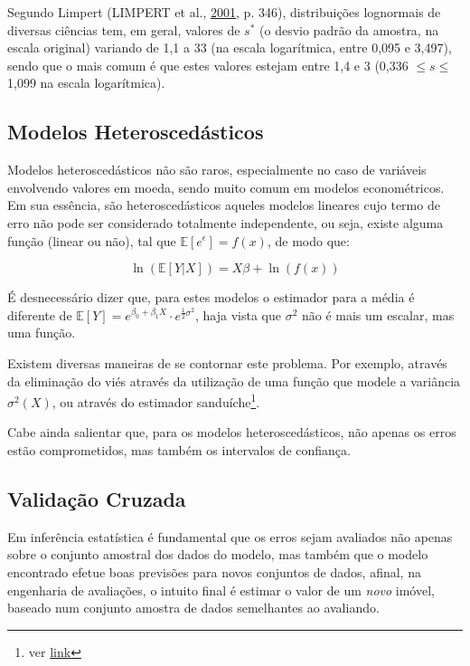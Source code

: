 \documentclass[a4paper, 12pt]{article}
\let\rmarkdownfootnote\footnote%
\def\footnote{\protect\rmarkdownfootnote}
\begin{document}
Segundo Limpert (LIMPERT et al., \protect\hyperlink{ref-limpert}{2001},
p. 346), distribuições lognormais de diversas ciências tem, em geral,
valores de \(s^*\) (o desvio padrão da amostra, na escala original)
variando de 1,1 a 33 (na escala logarítmica, entre 0,095 e 3,497), sendo
que o mais comum é que estes valores estejam entre 1,4 e 3 (0,336
\(\leq s \leq\) 1,099 na escala logarítmica).

\subsection{Modelos Heteroscedásticos}\label{modelos-heteroscedasticos}

Modelos heteroscedásticos não são raros, especialmente no caso de
variáveis envolvendo valores em moeda, sendo muito comum em modelos
econométricos. Em sua essência, são heteroscedásticos aqueles modelos
lineares cujo termo de erro não pode ser considerado totalmente
independente, ou seja, existe alguma função (linear ou não), tal que
\(\mathbb{E}[e^\epsilon] = f(x)\), de modo que:

\[\ln(\mathbb{E}[Y|X]) = X\beta + \ln(f(x))\]

É desnecessário dizer que, para estes modelos o estimador para a média é
diferente de
\(\mathbb{E}[Y] = e^{\beta_0 + \beta_1X} \cdot e^{\frac{1}{2}\sigma^2}\),
haja vista que \(\sigma^2\) não é mais um escalar, mas uma função.

Existem diversas maneiras de se contornar este problema. Por exemplo,
através da eliminação do viés através da utilização de uma função que
modele a variância \(\sigma^2(X)\), ou através do estimador
sanduíche\footnote{ver
  \href{https://matloff.wordpress.com/2015/09/18/can-you-say-heteroscedasticity-3-times-fast/}{link}}.

Cabe ainda salientar que, para os modelos heteroscedásticos, não apenas
os erros estão comprometidos, mas também os intervalos de confiança.

\subsection{Validação Cruzada}\label{validacao-cruzada}

Em inferência estatística é fundamental que os erros sejam avaliados não
apenas sobre o conjunto amostral dos dados do modelo, mas também que o
modelo encontrado efetue boas previsões para novos conjuntos de dados,
afinal, na engenharia de avaliações, o intuito final é estimar o valor
de um \emph{novo} imóvel, baseado num conjunto amostra de dados
semelhantes ao avaliando.
\end{document}
